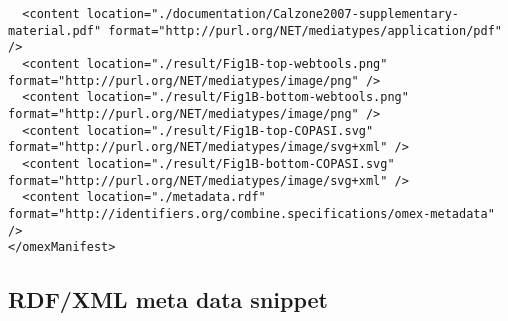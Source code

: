\begin{mdframed}[style=mddefault,frametitle={The \texttt{manifest.xml} of the final COMBINE archive}]
\begin{verbatim}
  <content location="./documentation/Calzone2007-supplementary-material.pdf" format="http://purl.org/NET/mediatypes/application/pdf" />
  <content location="./result/Fig1B-top-webtools.png" format="http://purl.org/NET/mediatypes/image/png" />
  <content location="./result/Fig1B-bottom-webtools.png" format="http://purl.org/NET/mediatypes/image/png" />
  <content location="./result/Fig1B-top-COPASI.svg" format="http://purl.org/NET/mediatypes/image/svg+xml" />
  <content location="./result/Fig1B-bottom-COPASI.svg" format="http://purl.org/NET/mediatypes/image/svg+xml" />
  <content location="./metadata.rdf" format="http://identifiers.org/combine.specifications/omex-metadata" />
</omexManifest>
\end{verbatim}
\end{mdframed}


\subsection{RDF/XML meta data snippet}
\label{sec:rdfmeta}
